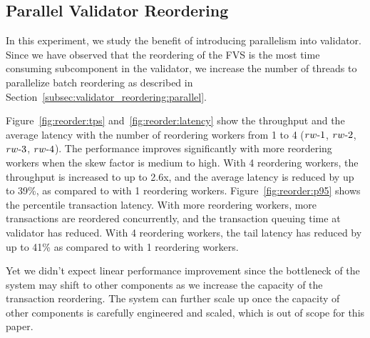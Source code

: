 \subsection{Parallel Validator Reordering}
In this experiment, we study the benefit of introducing parallelism into validator. Since we have observed that the reordering of the FVS is the most time consuming subcomponent in the validator, we increase the number of threads to parallelize batch reordering as described in Section~\ref{subsec:validator_reordering:parallel}. 

Figure~\ref{fig:reorder:tps} and~\ref{fig:reorder:latency} show the throughput
and the average latency with the number of reordering workers from 1 to 4
($rw\hbox{-}1$, $rw\hbox{-}2$, $rw\hbox{-}3$, $rw\hbox{-}4$). The performance improves significantly with more reordering workers when the skew factor is medium to high. With 4 reordering workers, the throughput is increased to up to 2.6x, and the average latency is reduced by up to 39\%, as compared to with 1 reordering workers. Figure~\ref{fig:reorder:p95} shows the percentile transaction latency. With more reordering workers, more transactions are reordered concurrently, and the transaction queuing time at validator has reduced. With 4 reordering workers, the tail latency has reduced by up to 41\% as compared to with 1 reordering workers. 

Yet we didn't expect linear performance improvement since the bottleneck of the system may shift to other
components as we increase the capacity of the transaction reordering. The system can further scale up once the capacity
of other components is carefully engineered and scaled,
which is out of scope for this paper.
